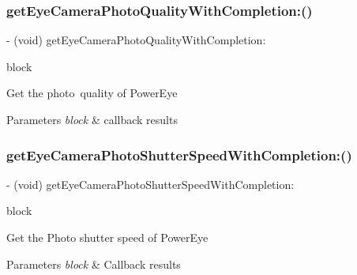 \subsubsection{\texorpdfstring{get\+Eye\+Camera\+Photo\+Quality\+With\+Completion\+:()}{getEyeCameraPhotoQualityWithCompletion:()}}
{\footnotesize\ttfamily -\/ (void) get\+Eye\+Camera\+Photo\+Quality\+With\+Completion\+: \begin{DoxyParamCaption}\item[{(void($^\wedge$)(P\+V\+Eye\+Camera\+Photo\+Quality photo\+Quality, N\+S\+Error $\ast$\+\_\+\+Nullable error))}]{block }\end{DoxyParamCaption}}

Get the photo quality of Power\+Eye


\begin{DoxyParams}{Parameters}
{\em block} & callback results \\
\hline
\end{DoxyParams}
\mbox{\label{interface_p_v_eye_camera_aee38ad2e7d3c2c19f784d41e9aa4b378}} 
\subsubsection{\texorpdfstring{get\+Eye\+Camera\+Photo\+Shutter\+Speed\+With\+Completion\+:()}{getEyeCameraPhotoShutterSpeedWithCompletion:()}}
{\footnotesize\ttfamily -\/ (void) get\+Eye\+Camera\+Photo\+Shutter\+Speed\+With\+Completion\+: \begin{DoxyParamCaption}\item[{(void($^\wedge$)(P\+V\+Eye\+Camera\+Photo\+Shutter\+Speed shutter\+Speed, N\+S\+Error $\ast$\+\_\+\+Nullable error))}]{block }\end{DoxyParamCaption}}

Get the Photo shutter speed of Power\+Eye


\begin{DoxyParams}{Parameters}
{\em block} & Callback results \\
\hline
\end{DoxyParams}
\mbox{\label{interface_p_v_eye_camera_a24dd28a21b97e49172b37f20e17b44b2}} 
